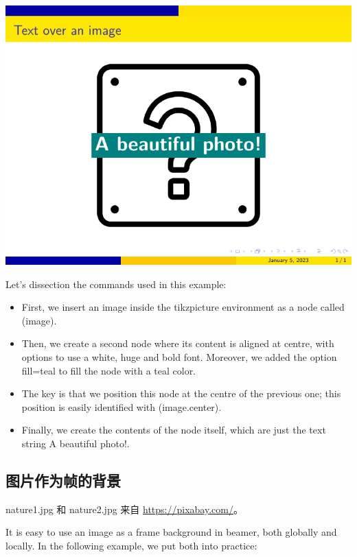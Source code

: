 \begin{column}{0.5\textwidth}
\includegraphics{examples/beamer/beamerfigure10.pdf}

Let’s dissection the commands used in this example:

\begin{itemize}
  \item First, we insert an image inside the {\ttfamily tikzpicture} environment as a node called ({\ttfamily image}).
  \item Then, we create a second node where its content is aligned at centre, with options to use a white, huge and bold font. Moreover, we added the option {\ttfamily fill=teal} to fill the node with a teal color.
  \item The key is that we position this node at the centre of the previous one; this position is easily identified with {\ttfamily (image.center)}.
  \item Finally, we create the contents of the node itself, which are just the text string {\ttfamily A beautiful photo!}.
\end{itemize}

\subsection{图片作为帧的背景}

nature1.jpg 和 nature2.jpg 来自 \url{https://pixabay.com/}。

It is easy to use an image as a frame background in beamer, both globally and locally. In the following example, we put both into practice:

\inputminted[linenos=true]{latex}{examples/beamer/beamerfigure11.tex}


\end{column}
